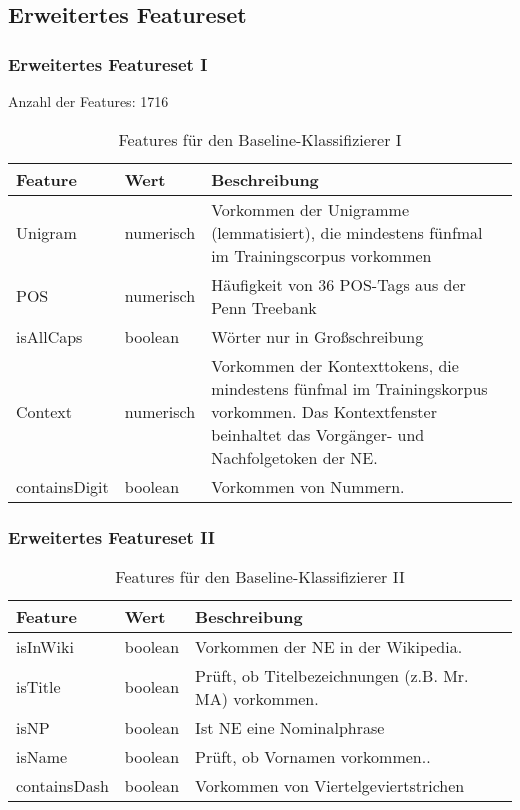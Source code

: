 \documentclass{beamer}
\begin{document}
	\subsection{Erweitertes Featureset}
	\begin{frame}
		\frametitle{Erweitertes Featureset I}
		Anzahl der Features: 1716
 			\begin{table}
 				\caption{Features für den Baseline-Klassifizierer I}
 				\begin{tabularx}{\textwidth}{llX}
 					\toprule
 					Feature & Wert & Beschreibung\\
 					\midrule
 					Unigram & numerisch & Vorkommen der Unigramme (lemmatisiert), die mindestens fünfmal im Trainingscorpus vorkommen \\
 					POS & numerisch & Häufigkeit von 36 POS-Tags aus der Penn Treebank\\
 					isAllCaps & boolean & Wörter nur in Großschreibung\\
 					Context & numerisch & Vorkommen der Kontexttokens, die mindestens fünfmal im Trainingskorpus vorkommen. Das Kontextfenster beinhaltet das Vorgänger- und Nachfolgetoken der NE.\\
 					containsDigit & boolean & Vorkommen von Nummern.\\
 					\bottomrule
 				\end{tabularx}
 				\label{tab:allf1}
 			\end{table}
 	\end{frame}
 		\begin{frame}
 			\frametitle{Erweitertes Featureset II}
 					\begin{table}
 						\caption{Features für den Baseline-Klassifizierer II}
 						\begin{tabularx}{\textwidth}{llX}
 							\toprule
 							Feature & Wert & Beschreibung\\
 							\midrule
 							isInWiki & boolean & Vorkommen der NE in der Wikipedia. \\
 							isTitle & boolean & Prüft, ob Titelbezeichnungen (z.B. Mr. MA) vorkommen.\\
 							isNP & boolean & Ist NE eine Nominalphrase \\
 							isName & boolean & Prüft, ob Vornamen vorkommen..\\
 							containsDash & boolean & Vorkommen von Viertelgeviertstrichen\\
 							\bottomrule
 						\end{tabularx}
 						\label{tab:allf2}
 					\end{table}
 		\end{frame}
\end{document}
